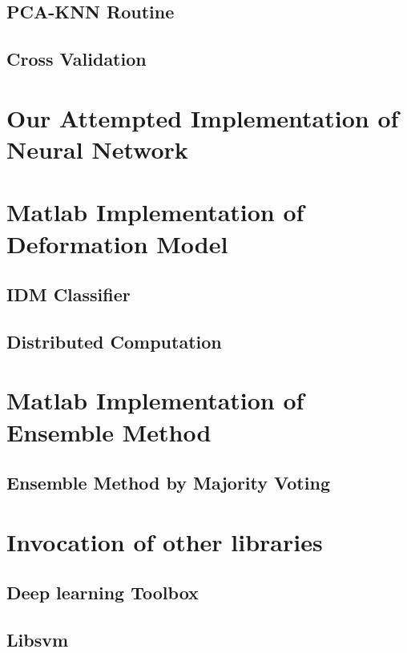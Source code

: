 \documentclass{article} %
\begin{document}
\subsection{PCA-KNN Routine}

\subsection{Cross Validation}

\newpage

\section{Our Attempted Implementation of Neural Network}

\newpage


\section{Matlab Implementation of Deformation Model}
\subsection{IDM Classifier}

\newpage
\subsection{Distributed Computation}

\newpage

\section{Matlab Implementation of Ensemble Method}
\subsection{Ensemble Method by Majority Voting}


\newpage
\section{Invocation of other libraries}
\subsection{Deep learning Toolbox}

\subsection{Libsvm}

\end{document}
